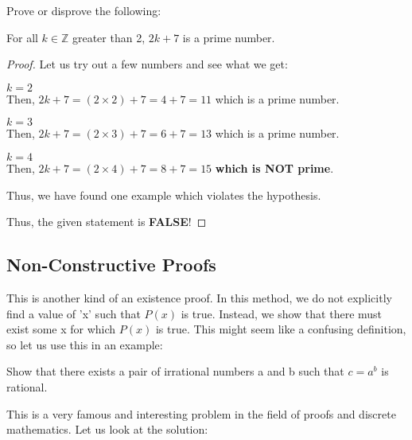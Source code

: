 \begin{example}
    Prove or disprove the following:
    \begin{center}
        For all $k \in \mathbb{Z}$ greater than 2, $2k + 7$ is a prime number.
    \end{center}
    \begin{proof}
        Let us try out a few numbers and see what we get:

        \begin{trylist}
            \item $k = 2$ \\
                Then, $2k + 7 = (2 \times 2) + 7 = 4 + 7 = 11$ which is a prime
                number.
            \item \textbf{$k = 3$} \\
                Then, $2k + 7 = (2 \times 3) + 7 = 6 + 7 = 13$ which is a prime number.
            \item $k = 4$ \\
                Then, $2k + 7 = (2 \times 4) + 7 = 8 + 7 = 15$ \textbf{which is NOT
                prime}.
        \end{trylist}

        \noindent Thus, we have found one example which violates the hypothesis.

        \noindent Thus, the given statement is \textbf{FALSE}!
    \end{proof}
\end{example}

\subsection{Non-Constructive Proofs}
This is another kind of an existence proof. In this method, we do not
explicitly find a value of 'x' such that $P(x)$ is true. Instead, we show that
there must exist some x for which $P(x)$ is true. This might seem like a
confusing definition, so let us use this in an example:

\begin{question}
    Show that there exists a pair of irrational numbers a and b such that $c =
    a^{b}$ is rational.
\end{question}

\begin{remark}
    This is a very famous and interesting problem in the field of proofs and
    discrete mathematics. Let us look at the solution:
\end{remark}

